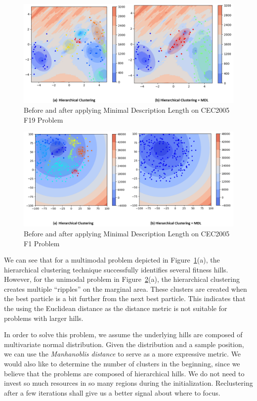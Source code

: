 \begin{figure}
\centering
\includegraphics[width=\textwidth]{MDL_comparison_F19}
\caption{Before and after applying Minimal Description Length on CEC2005 F19 Problem}\label{fig:MDL_comparison_F19}
\end{figure}

\begin{figure} 
\centering
\includegraphics[width=\textwidth]{MDL_comparison}
\caption{Before and after applying Minimal Description Length on CEC2005 F1 Problem}\label{fig:MDL_comparison}
\end{figure}

We can see that for a multimodal problem depicted in Figure~\ref{fig:MDL_comparison_F19}(a), 
the hierarchical clustering technique successfully identifies several fitness hills.
However, for the unimodal problem in Figure~\ref{fig:MDL_comparison}(a), 
the hierarchical clustering creates multiple ``ripples'' on the marginal area.
These clusters are created when the best particle is a bit further from the next best particle.
This indicates that the using the Euclidean distance as the distance metric is not suitable for problems with larger hills.

In order to solve this problem, we assume the underlying hills are composed of multivariate normal distribution.
Given the distribution and a sample position, we can use the \textit{Manhanoblis distance} to serve as a more expressive metric.
We would also like to determine the number of clusters in the beginning, since we believe that the problems are composed of hierarchical hills.
We do not need to invest so much resources in so many regions during the initialization.
Reclustering after a few iterations shall give us a better signal about where to focus.


